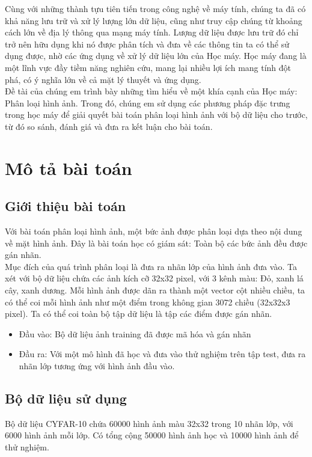 \documentclass[a4paper,12pt]{report}
\begin{document}
Cùng với những thành tựu tiên tiến trong công nghệ về máy tính, chúng ta đã có khả năng lưu trữ và xử lý lượng lớn dữ liệu, cũng như truy cập chúng từ khoảng cách lớn về địa lý thông qua mạng máy tính. Lượng dữ liệu được lưu trữ đó chỉ trở nên hữu dụng khi nó được phân tích và đưa về các thông tin ta có thể sử dụng được, nhờ các ứng dụng về xử lý dữ liệu lớn của Học máy. Học máy đang là một lĩnh vực đầy tiềm năng nghiên cứu, mang lại nhiều lợi ích mang tính đột phá, có ý nghĩa lớn về cả mặt lý thuyết và ứng dụng. \\

Đề tài của chúng em trình bày những tìm hiểu về một khía cạnh của Học máy: Phân loại hình ảnh. Trong đó, chúng em sử dụng các phương pháp đặc trưng trong học máy để giải quyết bài toán phân loại hình ảnh với bộ dữ liệu cho trước, từ đó so sánh, đánh giá và đưa ra kết luận cho bài toán. 
\chapter{Mô tả bài toán}
\section{Giới thiệu bài toán}
Với bài toán phân loại hình ảnh, một bức ảnh được phân loại dựa theo nội dung về mặt hình ảnh. Đây là bài toán học có giám sát: Toàn bộ các bức ảnh đều được gán nhãn. \\

Mục đích của quá trình phân loại là đưa ra nhãn lớp của hình ảnh đưa vào. Ta xét với bộ dữ liệu chứa các ảnh kích cỡ 32x32 pixel, với 3 kênh màu: Đỏ, xanh lá cây, xanh dương. Mỗi hình ảnh được dãn ra thành một vector cột nhiều chiều, ta có thể coi mỗi hình ảnh như một điểm trong không gian 3072 chiều (32x32x3 pixel). Ta có thể coi toàn bộ tập dữ liệu là tập các điểm được gán nhãn. 

\begin{itemize}
\item Đầu vào: Bộ dữ liệu ảnh training đã được mã hóa và gán nhãn
\end{itemize} 
\begin{itemize}
\item Đầu ra: Với một mô hình đã học và đưa vào thử nghiệm trên tập test, đưa ra nhãn lớp tương ứng với hình ảnh đầu vào.
\end{itemize}
\section{Bộ dữ liệu sử dụng}
Bộ dữ liệu CYFAR-10 chứa 60000 hình ảnh màu 32x32 trong 10 nhãn lớp, với 6000 hình ảnh mỗi lớp. Có tổng cộng 50000 hình ảnh học và 10000 hình ảnh để thử nghiệm.\\
\end{document}
